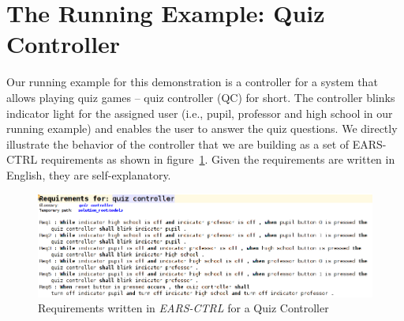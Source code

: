 \vspace{-.5cm}
\section{The Running Example: Quiz Controller}
\label{sec:example}
\vspace{-.3cm}
Our running example for this demonstration is a controller for a system that
allows playing quiz games -- quiz controller (QC) for short. The controller
blinks indicator light for the assigned user (i.e., pupil, professor and high
school in our running example) and enables the user to answer the quiz
questions.
We directly illustrate the behavior of the controller that we are building as a
set of \textsf{EARS-CTRL} requirements as shown in figure~\ref{fig:QC_reqs}. Given the requirements are written in English, they are self-explanatory.
\begin{figure}[!h]
\centering
\includegraphics[width=1\textwidth]{./images/QC_Reqs.png}
\caption{Requirements written in \emph{EARS-CTRL} for a Quiz Controller}
\label{fig:QC_reqs}
\end{figure}

